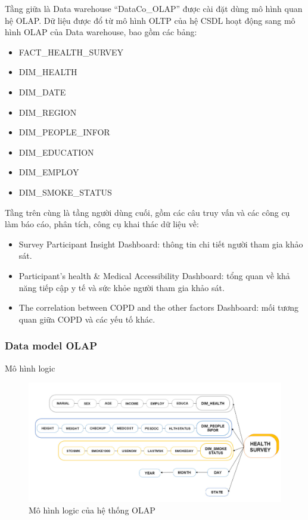 Tầng giữa là Data warehouse “DataCo\_OLAP” được cài đặt dùng mô hình quan hệ OLAP. Dữ liệu được đổ từ mô hình OLTP của hệ CSDL hoạt động sang mô hình OLAP của Data warehouse, bao gồm các bảng:
\begin{itemize}
    \item FACT\_HEALTH\_SURVEY
    \item DIM\_HEALTH
    \item DIM\_DATE
    \item DIM\_REGION
    \item DIM\_PEOPLE\_INFOR
    \item DIM\_EDUCATION
    \item DIM\_EMPLOY
    \item DIM\_SMOKE\_STATUS
\end{itemize}
Tầng trên cùng là tầng người dùng cuối, gồm các câu truy vấn và các công cụ làm báo cáo, phân tích, công cụ khai thác dữ liệu về:
\begin{itemize}
    \item Survey Participant Insight Dashboard: thông tin chi tiết người tham gia khảo sát.
    \item Participant’s health \& Medical Accessibility Dashboard: tổng quan về khả năng tiếp cập y tế và sức khỏe người tham gia khảo sát.
    \item The correlation between COPD and the other factors Dashboard: mối tương quan giữa COPD và các yếu tố khác.
\end{itemize}
\newpage
\subsubsection{Data model OLAP}
Mô hình logic
\begin{center}
        \begin{figure}[!h]
            \centering
            \includegraphics[scale = 0.35]{van/oltp_logic.png}
             \caption{Mô hình logic của hệ thống OLAP}
        \end{figure}
\end{center}

